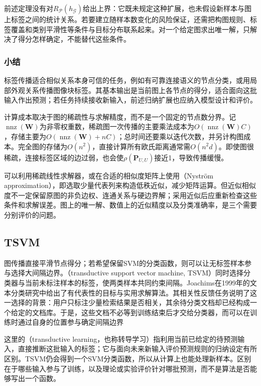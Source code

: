前述定理没有对$R_{\mathcal{P}}(h_{\mathcal{G}})$给出上界：它既未规定这种扩展，也未假设新样本与图上标签之间的统计关系。若要建立随样本数变化的风险保证，还需把构图规则、标签覆盖和类别平滑性等条件与目标分布联系起来。对一个给定图求出唯一解，只解决了得分怎样确定，不能替代这些条件。

\subsubsection{小结}
\label{sec:classification-label-propagation-summary}

标签传播适合相似关系本身可信的任务，例如有可靠连接语义的节点分类，或用局部外观关系传播图像块标签。其基本输出是当前图上各节点的得分，适合面向这批输入作出预测；若任务持续接收新输入，前述归纳扩展也应纳入模型设计和评价。

计算成本取决于图的稀疏性与求解精度，而不是一个固定的节点数分界。记$\operatorname{nnz}(\bm{W})$为非零权重数，稀疏图一次传播的主要乘法成本为$O(\operatorname{nnz}(\bm{W})C)$，存储主要为$O(\operatorname{nnz}(\bm{W})+nC)$；总时间还要乘以迭代次数，并另计构图成本。完全图的存储为$O(n^2)$，直接计算所有欧氏距离通常需$O(n^2d)$。即使图很稀疏，连接标签区域的边过弱，也会使$\rho(\bm{P}_{U,U})$接近1，导致传播缓慢。

可以利用稀疏线性求解器，或在合适的相似度矩阵上使用（Nyström approximation），即选取少量代表列来构造低秩近似，减少矩阵运算。但近似相似度不一定保留原图的非负边权、连通关系与硬边界解；采用近似后应重新检查这些条件和求解误差。图上的唯一解、数值上的近似精度以及分类准确率，是三个需要分别评价的问题。

\subsection{TSVM}
\label{sec:classification-tsvm}

图传播直接平滑节点得分；若希望保留SVM的分类函数，则可以让无标签样本参与选择大间隔边界。（transductive support vector machine, TSVM）同时选择分类器与当前未标注样本的标签，使两类样本共同约束间隔。Joachims在1999年的文本分类研究中给出了有代表性的目标与实用求解算法。其相关性反馈任务说明了这一选择的背景：用户只标注少量检索结果是否相关，其余待分类文档却已经构成一个给定的文档库。于是，这些文档不必等到训练结束后才交给分类器，而可以在训练时通过自身的位置参与确定间隔边界

这里的（transductive learning，也称转导学习）指利用当前已给定的待预测输入，直接推断这批输入的标签；它与面向未来新输入评价预测规则的归纳设定有所区别。TSVM仍会得到一个SVM分类函数，所以从计算上也能处理新样本。区别在于哪些输入参与了训练，以及理论或实验评价针对哪批预测，而不是算法是否能够写出一个函数。

